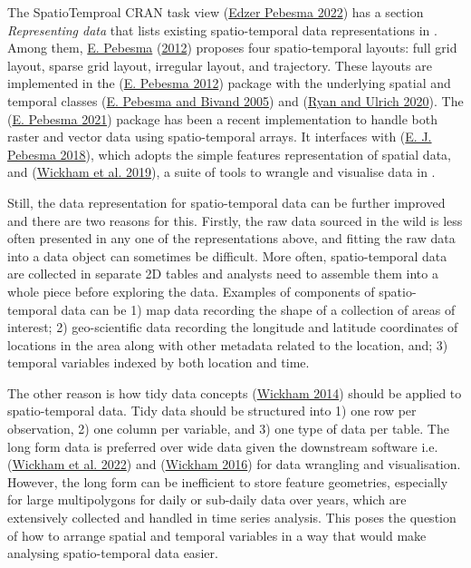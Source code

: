\documentclass{article}
\begin{document}
The SpatioTemproal CRAN task view (\protect\hyperlink{ref-ctvspatiotemporal}{Edzer Pebesma 2022}) has a section \emph{Representing data} that lists existing spatio-temporal data representations in . Among them, \protect\hyperlink{ref-spacetime}{E. Pebesma} (\protect\hyperlink{ref-spacetime}{2012}) proposes four spatio-temporal layouts: full grid layout, sparse grid layout, irregular layout, and trajectory. These layouts are implemented in the  (\protect\hyperlink{ref-spacetime}{E. Pebesma 2012}) package with the underlying spatial and temporal classes  (\protect\hyperlink{ref-sp}{E. Pebesma and Bivand 2005}) and  (\protect\hyperlink{ref-xts}{Ryan and Ulrich 2020}). The  (\protect\hyperlink{ref-stars}{E. Pebesma 2021}) package has been a recent implementation to handle both raster and vector data using spatio-temporal arrays. It interfaces with  (\protect\hyperlink{ref-sf}{E. J. Pebesma 2018}), which adopts the simple features representation of spatial data, and  (\protect\hyperlink{ref-tidyverse}{Wickham et al. 2019}), a suite of tools to wrangle and visualise data in .

Still, the data representation for spatio-temporal data can be further improved and there are two reasons for this. Firstly, the raw data sourced in the wild is less often presented in any one of the representations above, and fitting the raw data into a data object can sometimes be difficult. More often, spatio-temporal data are collected in separate 2D tables and analysts need to assemble them into a whole piece before exploring the data. Examples of components of spatio-temporal data can be 1) map data recording the shape of a collection of areas of interest; 2) geo-scientific data recording the longitude and latitude coordinates of locations in the area along with other metadata related to the location, and; 3) temporal variables indexed by both location and time.

The other reason is how tidy data concepts (\protect\hyperlink{ref-tidydata}{Wickham 2014}) should be applied to spatio-temporal data. Tidy data should be structured into 1) one row per observation, 2) one column per variable, and 3) one type of data per table. The long form data is preferred over wide data given the downstream software i.e.~ (\protect\hyperlink{ref-dplyr}{Wickham et al. 2022}) and  (\protect\hyperlink{ref-ggplot2}{Wickham 2016}) for data wrangling and visualisation. However, the long form can be inefficient to store feature geometries, especially for large multipolygons for daily or sub-daily data over years, which are extensively collected and handled in time series analysis. This poses the question of how to arrange spatial and temporal variables in a way that would make analysing spatio-temporal data easier.
\end{document}
